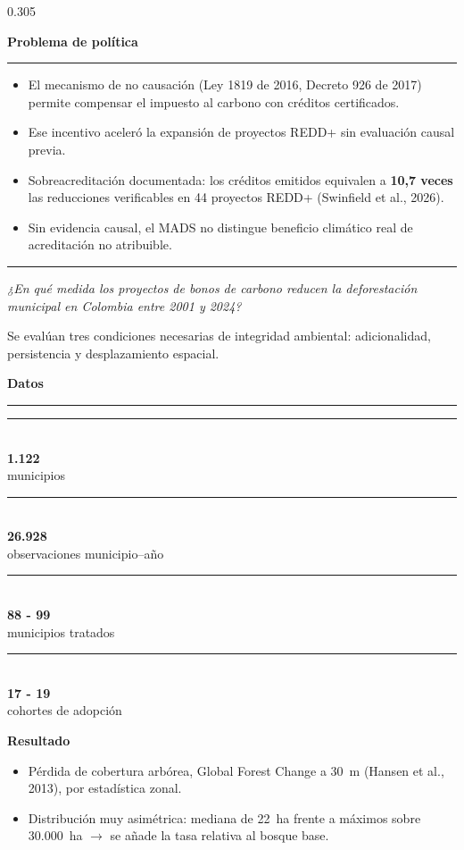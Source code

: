 \documentclass[final,t]{beamer}
\newcommand{\seccion}[2]{%
  \par\vspace{0.5\baselineskip}%
  {\color{dosel}\Large\bfseries #1\hfill{\color{tenue}\normalsize\mdseries #2}}\par
  \vspace{-0.35\baselineskip}%
  {\color{dosel}\rule{\linewidth}{2.2pt}}\par
  \vspace{0.25\baselineskip}%
}
\newcommand{\nota}[1]{{\color{tenue}\small #1\par}}
\newcommand{\cifra}[2]{%
  \parbox[t]{0.46\linewidth}{%
    {\color{tinta}\rule{\linewidth}{2.5pt}}\\[0.25\baselineskip]
    {\color{dosel}\fontsize{50}{52}\selectfont\bfseries #1}\\[0.2\baselineskip]
    {\color{tenue}\small #2}}%
}
\begin{document}
\begin{frame}[t]{}
\begin{columns}[t]
\begin{column}{0.305\paperwidth}
\seccion{Problema de política}{}
\begin{itemize}
  \item El mecanismo de no causación (Ley 1819 de 2016, Decreto 926 de 2017) permite compensar
        el impuesto al carbono con créditos certificados.
  \item Ese incentivo aceleró la expansión de proyectos REDD+ sin evaluación causal previa.
  \item[\textcolor{brasa}{\rule{0.45ex}{0.45ex}}] Sobreacreditación documentada: los créditos emitidos
        equivalen a \textbf{10,7 veces} las reducciones verificables en 44 proyectos REDD+
        (Swinfield et al., 2026).
  \item Sin evidencia causal, el MADS no distingue beneficio climático real de acreditación
        no atribuible.
\end{itemize}

\vspace{0.3cm}
{\color{amazonia}\rule{3pt}{2.6cm}}\hspace{0.4cm}%
\begin{minipage}[b]{0.88\linewidth}
  {\color{dosel}\fontsize{30}{36}\selectfont\itshape
   ¿En qué medida los proyectos de bonos de carbono reducen la deforestación municipal
   en Colombia entre 2001 y 2024?}
\end{minipage}

\vspace{0.3cm}
\nota{Se evalúan tres condiciones necesarias de integridad ambiental: adicionalidad,
persistencia y desplazamiento espacial.}

\seccion{Datos}{}
\cifra{1.122}{municipios}\hfill\cifra{26.928}{observaciones municipio--año}

\vspace{0.5cm}
\cifra{88 - 99}{municipios tratados}\hfill\cifra{17 - 19}{cohortes de adopción}

\vspace{0.6cm}
\textbf{\large Resultado}
\begin{itemize}
  \item Pérdida de cobertura arbórea, Global Forest Change a 30~m (Hansen et al., 2013),
        por estadística zonal.
  \item Distribución muy asimétrica: mediana de 22~ha frente a máximos sobre 30.000~ha
        $\rightarrow$ se añade la tasa relativa al bosque base.
\end{itemize}


\end{column}
\end{columns}
\end{frame}
\end{document}
